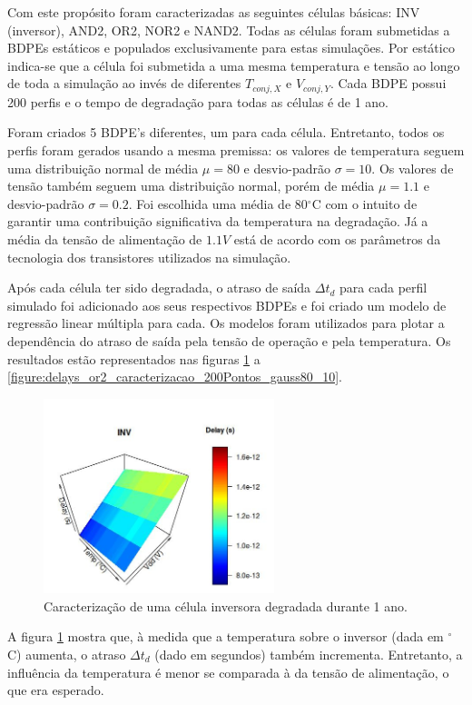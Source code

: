 Com este propósito foram caracterizadas as seguintes células básicas: INV (inversor), AND2, OR2, NOR2 e NAND2. Todas as células foram submetidas a BDPEs estáticos e populados exclusivamente para estas simulações. Por estático indica-se que a célula foi submetida a uma mesma temperatura e tensão ao longo de toda a simulação ao invés de diferentes $T_{conj,X}$ e $V_{conj,Y}$. Cada BDPE possui 200 perfis e o tempo de degradação para todas as células é de 1 ano.

Foram criados 5 BDPE's diferentes, um para cada célula. Entretanto, todos os perfis foram gerados usando a mesma premissa: os valores de temperatura seguem uma distribuição normal de média $\mu = 80$ e desvio-padrão $\sigma=10$. Os valores de tensão também seguem uma distribuição normal, porém de média $\mu = 1.1$ e desvio-padrão $\sigma=0.2$. Foi escolhida uma média de 80$^{\circ}$C com o intuito de garantir uma contribuição significativa da temperatura na degradação. Já a média da tensão de alimentação de $1.1V$ está de acordo com os parâmetros da tecnologia dos transistores utilizados na simulação.

Após cada célula ter sido degradada, o atraso de saída $\Delta t_d$ para cada perfil simulado foi adicionado aos seus respectivos BDPEs e foi criado um modelo de regressão linear múltipla para cada. Os modelos foram utilizados para plotar a dependência do atraso de saída pela tensão de operação e pela temperatura. Os resultados estão representados nas figuras \ref{figure:delays_inv_caracterizacao_200Pontos_gauss80_10} a \ref{figure:delays_or2_caracterizacao_200Pontos_gauss80_10}.
\begin{figure}[H]
\center
\includegraphics[width=0.6\textwidth]{images/delays_inv_caracterizacao_200Pontos_gauss80_10}
\caption{Caracterização de uma célula inversora degradada durante 1 ano.}
\label{figure:delays_inv_caracterizacao_200Pontos_gauss80_10}	
\end{figure}
A figura \ref{figure:delays_inv_caracterizacao_200Pontos_gauss80_10} mostra que, à medida que a temperatura sobre o inversor (dada em $^{\circ}$C) aumenta, o atraso $\Delta t_d$ (dado em segundos) também incrementa. Entretanto, a influência da temperatura é menor se comparada à da tensão de alimentação, o que era esperado.


